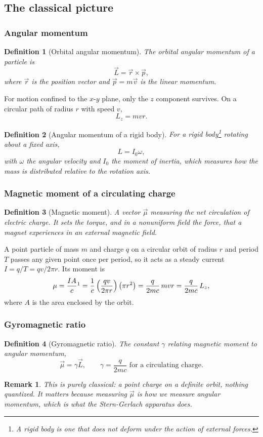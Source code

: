 \documentclass{article}
\newtheorem{definition}{Definition}
\newtheorem{remark}{Remark}
\begin{document}
\subsection{The classical picture}

\subsubsection{Angular momentum}
\begin{definition}[Orbital angular momentum]
    The orbital angular momentum of a particle is
    \[\vec{L} = \vec{r} \times \vec{p},\]
    where $\vec{r}$ is the position vector and $\vec{p} = m\vec{v}$ is the linear momentum.
\end{definition}
For motion confined to the $x$-$y$ plane, only the $z$ component survives. On a circular path of radius $r$ with speed $v$,
\[L_{z} = mvr.\]
\begin{definition}[Angular momentum of a rigid body]
    For a rigid body\footnote{A rigid body is one that does not deform under the action of external forces.} rotating about a fixed axis,
    \[L = I_{0}\omega,\]
    with $\omega$ the angular velocity and $I_{0}$ the moment of inertia, which measures how the mass is distributed relative to the rotation axis.
\end{definition}

\subsubsection{Magnetic moment of a circulating charge}
\begin{definition}[Magnetic moment]
    A vector $\vec{\mu}$ measuring the net circulation of electric charge. It sets the torque, and in a nonuniform field the force, that a magnet experiences in an external magnetic field.
\end{definition}
A point particle of mass $m$ and charge $q$ on a circular orbit of radius $r$ and period $T$ passes any given point once per period, so it acts as a steady current $I = q/T = qv/2\pi r$. Its moment is
\[\mu = \frac{IA}{c}\footnotemark = \frac{1}{c}\left(\frac{qv}{2\pi r}\right)\left(\pi r^{2}\right) = \frac{q}{2mc}\,mvr = \frac{q}{2mc}\,L_{z},\]
where $A$ is the area enclosed by the orbit.

\subsubsection{Gyromagnetic ratio}
\begin{definition}[Gyromagnetic ratio]
    The constant $\gamma$ relating magnetic moment to angular momentum,
    \[\vec{\mu} = \gamma \vec{L}, \qquad \gamma = \frac{q}{2mc} \text{ for a circulating charge.}\]
\end{definition}
\begin{remark}
    This is purely classical: a point charge on a definite orbit, nothing quantized. It matters because measuring $\vec{\mu}$ is how we measure angular momentum, which is what the Stern-Gerlach apparatus does.
\end{remark}
\end{document}
